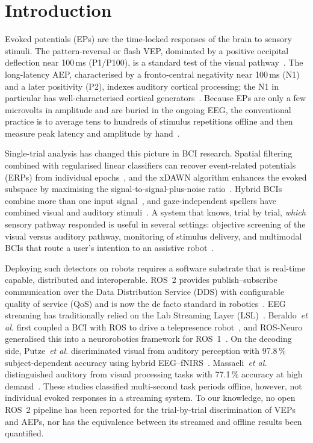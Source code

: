 \documentclass[conference]{IEEEtran}
\begin{document}
\section{Introduction}
Evoked potentials (EPs) are the time-locked responses of the brain to sensory stimuli. The pattern-reversal or flash VEP, dominated by a positive occipital deflection near 100\,ms (P1/P100), is a standard test of the visual pathway~\cite{odom2016iscev}. The long-latency AEP, characterised by a fronto-central negativity near 100\,ms (N1) and a later positivity (P2), indexes auditory cortical processing; the N1 in particular has well-characterised cortical generators~\cite{naatanen1987n1}. Because EPs are only a few microvolts in amplitude and are buried in the ongoing EEG, the conventional practice is to average tens to hundreds of stimulus repetitions offline and then measure peak latency and amplitude by hand~\cite{picton2000guidelines}.

Single-trial analysis has changed this picture in BCI research. Spatial filtering combined with regularised linear classifiers can recover event-related potentials (ERPs) from individual epochs~\cite{blankertz2011tutorial,krusienski2006comparison,lotte2018review}, and the xDAWN algorithm enhances the evoked subspace by maximising the signal-to-signal-plus-noise ratio~\cite{rivet2009xdawn}. Hybrid BCIs combine more than one input signal~\cite{pfurtscheller2010hybrid}, and gaze-independent spellers have combined visual and auditory stimuli~\cite{an2014exploring}. A system that knows, trial by trial, \emph{which} sensory pathway responded is useful in several settings: objective screening of the visual versus auditory pathway, monitoring of stimulus delivery, and multimodal BCIs that route a user's intention to an assistive robot~\cite{wolpaw2002bci}.

Deploying such detectors on robots requires a software substrate that is real-time capable, distributed and interoperable. ROS~2 provides publish--subscribe communication over the Data Distribution Service (DDS) with configurable quality of service (QoS) and is now the de facto standard in robotics~\cite{macenski2022ros2,maruyama2016exploring}. EEG streaming has traditionally relied on the Lab Streaming Layer (LSL)~\cite{kothe2025lsl}. Beraldo~\emph{et al.} first coupled a BCI with ROS to drive a telepresence robot~\cite{beraldo2018bciros}, and ROS-Neuro generalised this into a neurorobotics framework for ROS~1~\cite{tonin2022rosneuro}. On the decoding side, Putze~\emph{et al.} discriminated visual from auditory perception with 97.8\,\% subject-dependent accuracy using hybrid EEG--fNIRS~\cite{putze2014hybrid}. Massaeli~\emph{et al.} distinguished auditory from visual processing tasks with 77.1\,\% accuracy at high demand~\cite{massaeli2023modality}. These studies classified multi-second task periods offline, however, not individual evoked responses in a streaming system. To our knowledge, no open ROS~2 pipeline has been reported for the trial-by-trial discrimination of VEPs and AEPs, nor has the equivalence between its streamed and offline results been quantified.
\end{document}
